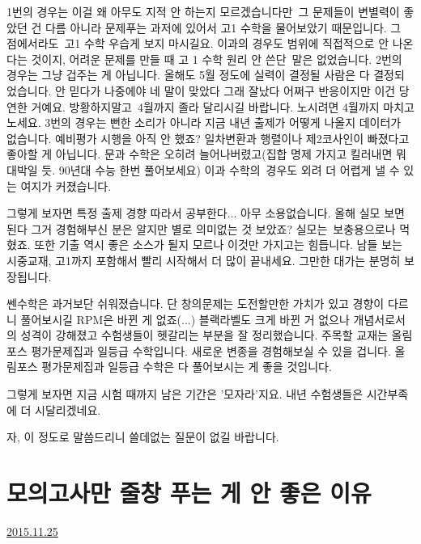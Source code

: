 1번의 경우는 이걸 왜 아무도 지적 안 하는지 모르겠습니다만 그 문제들이 변별력이 좋았던 건
다름 아니라 문제푸는 과저에 있어서 고1 수학을 물어보았기 때문입니다. 그 점에서라도 고1 수학 우습게 보지 마시길요.
이과의 경우도 범위에 직접적으로 안 나온다는 것이지, 어려운 문제를 만들 때 고 1 수학 원리 안 쓴단 말은 없었습니다.
2번의 경우는 그냥 겁주는 게 아닙니다. 올해도 5월 정도에 실력이 결정될 사람은 다 결정되었습니다.
안 믿다가 나중에야 네 말이 맞았다 그래 잘났다 어쩌구 반응이지만 이건 당연한 거예요.
방황하지말고 4월까지 졸라 달리시길 바랍니다. 노시려면 4월까지 마치고 노세요.
3번의 경우는 뻔한 소리가 아니라 지금 내년 출제가 어떻게 나올지 데이터가 없습니다. 예비평가 시행을 아직 안 했죠?
일차변환과 행렬이나 제2코사인이 빠졌다고 좋아할 게 아닙니다.
문과 수학은 오히려 늘어나버렸고(집합 명제 가지고 킬러내면 뭐 대박일 듯. 90년대 수능 한번 풀어보세요)
이과 수학의 경우도 외려 더 어렵게 낼 수 있는 여지가 커졌습니다.
\vspace{5mm}

그렇게 보자면 특정 출제 경향 따라서 공부한다... 아무 소용없습니다.
올해 실모 보면 된다 그거 경험해부신 분은 알지만 별로 의미없는 것 보았죠? 실모는 보충용으로나 먹혔죠.
또한 기출 역시 좋은 소스가 될지 모르나 이것만 가지고는 힘듭니다.
남들 보는 시중교재, 고1까지 포함해서 빨리 시작해서 더 많이 끝내세요. 그만한 대가는 분명히 보장됩니다.
\vspace{5mm}

쎈수학은 과거보단 쉬워졌습니다. 단 창의문제는 도전할만한 가치가 있고 경향이 다르니 풀어보시길
RPM은 바뀐 게 없죠(...)
블랙라벨도 크게 바뀐 거 없으나 개념서로서의 성격이 강해졌고 수험생들이 헷갈리는 부분을 잘 정리했습니다.
주목할 교재는 올림포스 평가문제집과 일등급 수학입니다. 새로운 변종을 경험해보실 수 있을 겁니다.
올림포스 평가문제집과 일등급 수학은 다 풀어보시는 게 좋을 것입니다.
\vspace{5mm}

그렇게 보자면 지금 시험 때까지 남은 기간은 '모자라'지요.
내년 수험생들은 시간부족에 더 시달리겠네요.
\vspace{5mm}

자, 이 정도로 말씀드리니 쓸데없는 질문이 없길 바랍니다.
\vspace{5mm}







\section{모의고사만 줄창 푸는 게 안 좋은 이유}
\href{https://www.kockoc.com/Apoc/509601}{2015.11.25}

